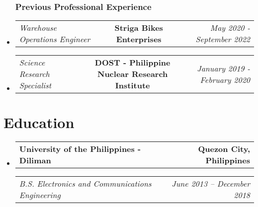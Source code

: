 \documentclass[11pt,letterpaper]{article}
\makeatletter
\newcommand{\headerrow}[2]
{\begin{tabular*}{\linewidth}{l@{\extracolsep{\fill}}r}
#1 &
#2 \\
\end{tabular*}}
\newcommand{\headerrowthree}[3]{%
  \begin{tabular*}{\linewidth}{l@{\extracolsep{\fill}}c@{\extracolsep{\fill}}r}
    #1 & %
    #2 & %
    #3 \\ %
  \end{tabular*}
}
\makeatother
\begin{document}
\begin{itemize}[leftmargin=1em]

\subsubsection*{\large Previous Professional Experience}
    \item
          \headerrowthree
          {\emph{Warehouse Operations Engineer}}
          {\textbf{Striga Bikes Enterprises}}
          {\textit{May 2020 - September 2022}}

	\item
          \headerrowthree
          {\emph{Science Research Specialist}}
          {\textbf{DOST - Philippine Nuclear Research Institute}}
          {\textit{January 2019 - February 2020}}
\end{itemize}

\section*{\Large Education}

\begin{itemize}[leftmargin=1em]
    \parskip=0.1em
    	
    \item
          \headerrow
          {\textbf{University of the Philippines - Diliman}}
          {\textbf{Quezon City, Philippines}}
          \headerrow
          {\emph{B.S. Electronics and Communications Engineering}}
          {\emph{June 2013 -- December 2018}}
          	      
\end{itemize}
\end{document}
